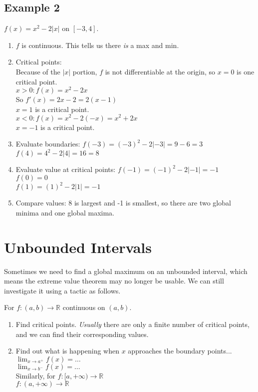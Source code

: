 \subsection{Example 2}
$f(x) = x^2 - 2|x|$ on $[-3,4]$.
\begin{enumerate}
  \item $f$ is continuous. This tells us there \emph{is} a max and min.
  \item Critical points: \\
  Because of the $|x|$ portion, $f$ is not differentiable at the origin, so
  $x=0$ is one critical point. \\
  $x>0 : f(x) = x^2 - 2x$ \\
  So $f'(x) = 2x-2 = 2(x-1)$ \\
  $x=1$ is a critical point. \\
  $x < 0: f(x) = x^2 -2(-x) = x^2 + 2x$ \\
  $x=-1$ is a critical point. \\
  \item Evaluate boundaries:
  $f(-3) = (-3)^2 -2|-3| = 9-6 = 3$ \\
  $f(4) = 4^2 - 2|4| = 16 = 8$ \\
  \item Evaluate value at critical points:
  $f(-1) = (-1)^2 -2|-1| = -1$ \\
  $f(0) = 0$ \\
  $f(1) = (1)^2 -2|1| = -1$ \\
  \item Compare values: 8 is largest and -1 is smallest, so there are two global
  minima and one global maxima.
\end{enumerate}

\section{Unbounded Intervals}
Sometimes we need to find a global maximum on an unbounded interval, which means
the extreme value theorem may no longer be usable. We can still investigate it
using a tactic as follows.

For $f: (a,b) \to \mathbb{R}$ continuous on $(a,b)$.
\begin{enumerate}
  \item Find critical points. \emph{Usually} there are only a finite number of
  critical points, and we can find their corresponding values.
  \item Find out what is happening when $x$ approaches the boundary points... \\
  $\lim_{x \to a^+} f(x) = \ldots$ \\
  $\lim_{x \to b^-} f(x) = \ldots$ \\
  Similarly, for
  $f:[a,+\infty) \to \mathbb{R}$\\
  $f:(a,+\infty) \to \mathbb{R}$\\
\end{enumerate}


